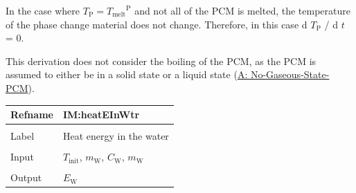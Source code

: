 \documentclass[12pt]{article}
\begin{document}
In the case where ${T_{\text{P}}}={{T_{\text{melt}}}^{\text{P}}}$ and not all of the PCM is melted, the temperature of the phase change material does not change. Therefore, in this case d ${T_{\text{P}}}$ / d $t$ = 0.

This derivation does not consider the boiling of the PCM, as the PCM is assumed to either be in a solid state or a liquid state (\hyperref[assumpNGSP]{A: No-Gaseous-State-PCM}).

\vspace{\baselineskip}
\noindent
\begin{minipage}{\textwidth}
\begin{tabular}{>{\raggedright}p{}>{\raggedright\arraybackslash}p{}}
\toprule \textbf{Refname} & \textbf{IM:heatEInWtr}
\label{IM:heatEInWtr}
\\ \midrule \\
Label & Heat energy in the water
        
\\ \midrule \\
Input & ${T_{\text{init}}}$, ${m_{\text{W}}}$, ${C_{\text{W}}}$, ${m_{\text{W}}}$
        
\\ \midrule \\
Output & ${E_{\text{W}}}$
         

\end{tabular}
\end{minipage}
\end{document}
